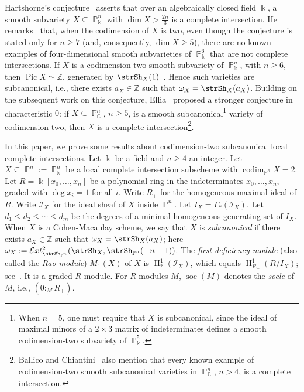 \documentclass[11pt,a4paper]{amsart}
\theoremstyle{plain}
\theoremstyle{definition}
\newcommand{\calI}{\mathcal I}
\newcommand{\ints}{\mathbb{Z}}
\newcommand{\complex}{\mathbb{C}}
\DeclareMathOperator{\projective}{\mathbb{P}}
\DeclareMathOperator{\codim}{codim}
\DeclareMathOperator{\homology}{H}
\newcommand{\define}[1]{\emph{#1}}
\DeclareMathOperator{\socle}{soc}
\DeclareMathOperator{\Pic}{Pic}
\newcommand{\sheafExt}{\mathcal{E}xt}
\begin{document}
Hartshorne's conjecture~\cite[p.~1017]{HartshorneVarSmallCodim1974} asserts
that over an algebraically closed field $\Bbbk$,
a smooth subvariety $X \subseteq  \projective_\Bbbk^n$
with $\dim X > \frac {2n}3$ is a complete intersection.
He remarks~\cite[p.~1022]{HartshorneVarSmallCodim1974} that,
when the codimension of $X$ is two,
even though the conjecture is stated only for $n \geq 7$ (and,
consequently, $\dim X \geq 5$), there are no known examples of
four-dimensional smooth subvarieties of $\projective_\Bbbk^6$ that are not
complete intersections. 
If $X$ is a codimension-two smooth subvariety
of $\projective_\Bbbk^n$, with $n \geq 6$, then $\Pic X \simeq \ints$,
generated
by $\strSh_X(1)$~\cite[Theorem~2.2(d)]{HartshorneVarSmallCodim1974}.
Hence such varieties are subcanonical, i.e., 
there exists $a_X \in \ints$ such that $\omega_X = \strSh_X(a_X)$.
Building on the subsequent work on
this conjecture, Ellia~\cite[Conjecture~2]{ElliaSurvey2000} proposed a
stronger
conjecture in characteristic $0$: if $X \subseteq \projective^n_\complex$,
$n \geq 5$, is a smooth subcanonical\footnote
{When $n=5$, one must require that $X$ is subcanonical, since
the ideal of maximal minors of a $2 \times 3$ matrix of indeterminates
defines a smooth codimension-two subvariety of $\projective_\Bbbk^5$.}
variety of codimension two, then $X$ is a complete 
intersection\footnote{Ballico and
Chiantini~\cite[p.~100]{BallicoChiantiniSmSubcan1983} also mention that 
every known example of
codimension-two smooth subcanonical varieties in
$\projective^n_\complex$, $n > 4$, is a complete intersection.}.

In this paper, we prove some results about 
codimension-two subcanonical local complete intersections.
Let $\Bbbk$ be a field and $n \geq 4$ an integer.
Let $X \subseteq \projective^n := \projective^n_\Bbbk$ be a local complete
intersection subscheme with $\codim_{\projective^n}X = 2$.
Let $R = \Bbbk[x_0, \ldots, x_n]$ be a polynomial ring in the
indeterminates $x_0, \ldots, x_n$, graded with $\deg x_i = 1$ for all $i$.
Write $R_+$ for the homogeneous maximal ideal of $R$.
Write $\calI_X$ for the ideal sheaf of $X$ inside $\projective^n$.
Let $I_X = \Gamma_*(\calI_X)$. Let $d_1 \leq d_2 \leq \cdots \leq d_m$ be
the degrees of a minimal homogeneous generating set of $I_X$.
When $X$ is a Cohen-Macaulay scheme,
we say that $X$ is \define{subcanonical} if there exists $a_X \in \ints$
such that $\omega_X = \strSh_X(a_X)$;
here $\omega_X :=
\sheafExt_{\strSh_{\projective^n}}^2(\strSh_X,
\strSh_{\projective^n}(-n-1))$.
The \define{first deficiency module} (also called the \emph{Rao module})
$M_1(X)$ of $X$ is 
$\homology^1_*(\calI_X)$, which equals $\homology_{R_+}^1(R/I_X)$;
see~\cite[\S 1.2]{MiglioreLiaisonBook1998}.
It is a graded $R$-module.
For $R$-modules $M$, $\socle(M)$ denotes the \define{socle} of $M$, i.e.,
$(0:_M R_+)$.
\end{document}
